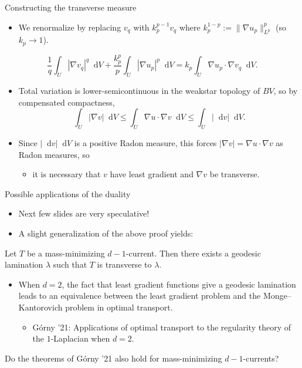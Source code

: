 \documentclass[10pt]{beamer}
\newcommand*\dif{\mathop{}\!\mathrm{d}}
\begin{document}
\begin{frame}{Constructing the transverse measure}
\begin{itemize}
\item We renormalize by replacing $v_q$ with $k_p^{p - 1} v_q$ where $k_p^{1 - p} := \|\nabla u_p\|_{L^p}^p$ (so $k_p \to 1$).
\end{itemize}

\begin{lemma}[B '24]
$$\frac{1}{q} \int_U |\nabla v_q|^q \dif V + \frac{k_p^p}{p} \int_U |\nabla u_p|^p \dif V = k_p \int_U \nabla u_p \cdot \nabla v_q \dif V.$$
\end{lemma}

\begin{itemize}
\item Total variation is lower-semicontinuous in the weakstar topology of $BV$, so by compensated compactness,
$$\int_U |\nabla v| \dif V \leq \int_U \nabla u \cdot \nabla v \dif V \leq \int_U |\dif v| \dif V.$$
\item Since $|\dif v| \dif V$ is a positive Radon measure, this forces $|\nabla v| = \nabla u \cdot \nabla v$ as Radon measures, so 
\begin{itemize}
\item it is necessary that $v$ have least gradient and $\nabla v$ be transverse.
\end{itemize}
\end{itemize}
\end{frame}

\begin{frame}{Possible applications of the duality}
\begin{itemize}
\item Next few slides are very speculative!
\item A slight generalization of the above proof yields:
\end{itemize}

\begin{theorem}
Let $T$ be a mass-minimizing $d - 1$-current.
Then there exists a geodesic lamination $\lambda$ such that $T$ is transverse to $\lambda$.
\end{theorem}

\begin{itemize}
\item When $d = 2$, the fact that least gradient functions give a geodesic lamination leads to an equivalence between the least gradient problem and the Monge--Kantorovich problem in optimal transport.
\begin{itemize}
\item G\'orny '21: Applications of optimal transport to the regularity theory of the $1$-Laplacian when $d = 2$.
\end{itemize}
\end{itemize}

\begin{problem}
Do the theorems of G\'orny '21 also hold for mass-minimizing $d - 1$-currents?
\end{problem}
\end{frame}
\end{document}
